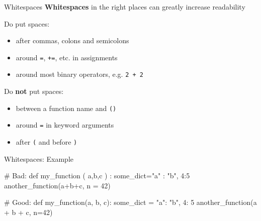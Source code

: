 \begin{frame}{Whitespaces}
    \textbf{Whitespaces} in the right places can greatly increase readability

    \vspace{1em}

    Do put spaces:
    \begin{itemize}
        \item after commas, colons and semicolons
        \item around \texttt{=}, \texttt{+=}, etc. in assignments
        \item around most binary operators, e.g. \texttt{2 + 2}
    \end{itemize}

    Do \textbf{not} put spaces:
    \begin{itemize}
        \item between a function name and \texttt{()}
        \item around \texttt{=} in keyword arguments
        \item after \texttt{(} and before \texttt{)}
    \end{itemize}


\end{frame}

\begin{frame}[fragile]{Whitespaces: Example}

    \begin{pythoncode}
    # Bad:
    def my_function ( a,b,c ) :
        some_dict={"a" : "b", 4:5}
        another_function(a+b+c, n = 42)

    # Good:
    def my_function(a, b, c):
        some_dict = {"a": "b", 4: 5}
        another_function(a + b + c, n=42)
    \end{pythoncode}

\end{frame}

